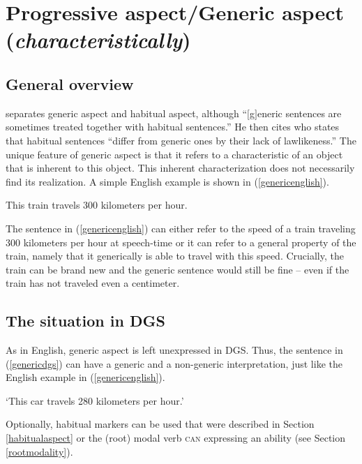 \section{Progressive aspect/Generic aspect (\textit{characteristically})}\label{characteristic}
\subsection{General overview}
\citet[99]{cinque1999adverbs} separates generic aspect and habitual aspect, although ``$[$g$]$eneric sentences are sometimes treated together with habitual sentences.'' He then cites \citet[97]{dahl1985tense} who states that habitual sentences ``differ from generic ones by their lack of lawlikeness.'' The unique feature of generic aspect is that it refers to a characteristic of an object that is inherent to this object. This inherent characterization does not necessarily find its realization. A simple English example is shown in (\ref{genericenglish}).

\begin{exe}
\ex This train travels 300 kilometers per hour. \label{genericenglish}
\end{exe} 

\noindent The sentence in (\ref{genericenglish}) can either refer to the speed of a train traveling 300 kilometers per hour at speech-time or it can refer to a general property of the train, namely that it generically is able to travel with this speed. Crucially, the train can be brand new and the generic sentence would still be fine -- even if the train has not traveled even a centimeter. 

\subsection{The situation in DGS}
As in English, generic aspect is left unexpressed in DGS. Thus, the sentence in (\ref{genericdgs}) can have a generic and a non-generic interpretation, just like the English example in (\ref{genericenglish}).


\begin{exe}
\glt `This car travels 280 kilometers per hour.'\label{genericdgs}
\end{exe} 

\noindent Optionally, habitual markers can be used that were described in Section \ref{habitualaspect} or the (root) modal verb \textsc{can} expressing an ability (see Section \ref{rootmodality}).


